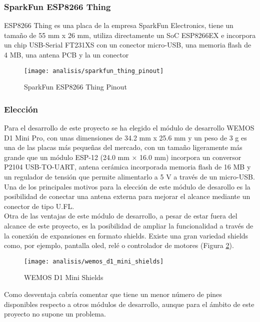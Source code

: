 \documentclass[../proyecto.tex]{subfiles}
\begin{document}
\subsubsection{SparkFun ESP8266 Thing}
ESP8266 Thing \cite{sparkfun_thing_official_page} es una placa de la empresa SparkFun Electronics, tiene un tamaño de 55 mm x 26 mm, utiliza directamente un SoC ESP8266EX e incorpora un chip USB-Serial FT231XS con un conector micro-USB, una memoria flash de 4 MB, una antena PCB y la un conector
\begin{figure}[H]
\centering
\texttt{[image: analisis/sparkfun\_thing\_pinout]}
\caption{SparkFun ESP8266 Thing Pinout}
\label{fig:sparkfun_thing_pinout}
\end{figure}


\subsubsection{Elección}

Para el desarrollo de este proyecto se ha elegido el módulo de desarrollo WEMOS D1 Mini Pro, con unas dimensiones de 34.2 mm x 25.6 mm y un peso de 3 g es una de las placas más pequeñas del mercado, con un tamaño ligeramente más grande que un módulo ESP-12 (24.0 mm × 16.0 mm) incorpora un conversor P2104 USB-TO-UART, antena cerámica incorporada memoria flash de 16 MB y un regulador de tensión que permite alimentarlo a 5 V a través de un micro-USB. Una de los principales motivos para la elección de este módulo de desarollo es la posibilidad de conectar una antena externa para mejorar el alcance mediante un conector de tipo U.FL. \\

Otra de las ventajas de este módulo de desarrollo, a pesar de estar fuera del alcance de este proyecto, es la posibilidad de ampliar la funcionalidad a través de la conexión de expansiones en formato shields. Existe una gran variedad shields como, por ejemplo, pantalla oled, relé o controlador de motores (Figura \ref{fig:wemos_d1_mini_shields}).\\

\begin{figure}[h]
\centering
\texttt{[image: analisis/wemos\_d1\_mini\_shields]}
\caption{WEMOS D1 Mini Shields}
\label{fig:wemos_d1_mini_shields}
\end{figure}

Como desventaja cabría comentar que tiene un menor número de pines disponibles respecto a otros módulos de desarrollo, aunque para el ámbito de este proyecto no supone un problema.\\
\end{document}
